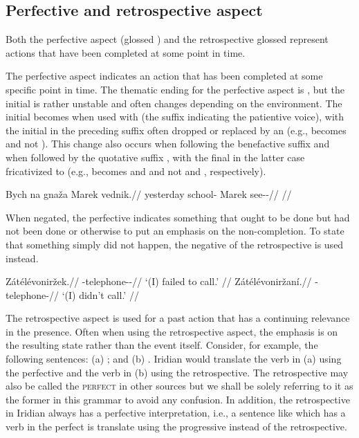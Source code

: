 \subsection{Perfective and retrospective
aspect}\label{sec:perfective-retrospective}

Both the perfective aspect (glossed \Pf{}) and the retrospective {glossed
\Ret{}} represent actions that have been completed at some point in time.

The perfective aspect indicates an action that has been completed at some
specific point in time. The thematic ending for the perfective aspect is
, but the initial  is rather unstable and often changes
depending on the environment. The initial  becomes  when used
with  (the suffix indicating the patientive voice), with the initial
 in the preceding suffix often dropped or replaced by an  (e.g.,
 becomes  and not ).
This change also occurs when following the benefactive suffix  and when
followed by the quotative suffix , with the final  in the latter
case fricativized to  (e.g.,  becomes
 and  and not
 and , respectively).

\pex
\begingl
\gla Bych na gnaža Marek vednik.//
\glb yesterday \Loc{} school-\Acc{} Marek see-\Pv{}-\Pf{}//
\glft {}//
\endgl
\xe

When negated, the perfective indicates something that ought to be done but had
not been done or otherwise to put an emphasis on the non-completion. To state
that something simply did not happen, the negative of the retrospective is used
instead.

\begin{multicols}{2}
\pex
\a\begingl
\gla Zátélévoniržek.//
\glb \Neg{}-telephone-\Av{}-\Pf{}//
\glft `(I) failed to call.' //
\endgl
\a\begingl
\gla Zátélévoniržaní.//
\glb \Neg{}-telephone-//
\glft `(I) didn't call.' //
\endgl
\xe
\end{multicols}

The retrospective aspect is used for a past action that has a continuing
relevance in the presence. Often when using the retrospective aspect, the
emphasis is on the resulting state rather than the event itself. Consider, for
example, the following sentences: (a) ; and
(b) . Iridian would translate the
verb in (a) using the perfective and the verb in (b) using the retrospective.
The retrospective may also be called the {\scshape perfect} in other sources but
we shall be solely referring to it as the former in this grammar to avoid any
confusion. In addition, the retrospective in Iridian always has a perfective
interpretation, i.e., a sentence like 
which has a verb in the perfect is translate using the progressive instead of
the retrospective.


